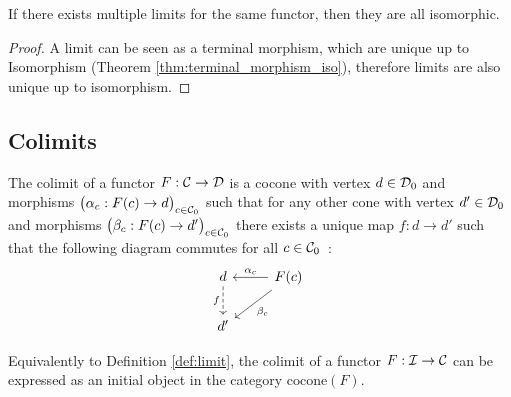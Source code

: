 \begin{theorem}
	If there exists multiple limits for the same functor, then they are all
	isomorphic.

	\begin{proof}
		A limit can be seen as a terminal morphism, which are unique up to
		Isomorphism (Theorem \ref{thm:terminal_morphism_iso}), therefore limits are
		also unique up to isomorphism.
	\end{proof}
\end{theorem}

\subsection{Colimits}

\begin{definition}
	The colimit of a functor $F:\mathcal{C}\to \mathcal{D}$ is a cocone with vertex $d\in \mathcal{D}_0$ and
	morphisms $\big(\alpha_c: F(c)\to d\big)_{c\in \mathcal{C}_0}$ such that for any other
	cone with vertex $d'\in \mathcal{D}_0$ and morphisms $\big(\beta_c: F(c)\to
	d'\big)_{c\in \mathcal{C}_0}$ there exists a unique map $f:d\to d'$ such that the
	following diagram commutes for all $c\in
	\mathcal{C}_0$~\parencite{leinster:basic_category_theory}:
	\[\begin{tikzcd}[ampersand replacement=\&]
		d \& {F(c)} \\
		{d'}
		\arrow["{\alpha_c}"', from=1-2, to=1-1]
		\arrow["{\beta_c}", from=1-2, to=2-1]
		\arrow["f"', dashed, from=1-1, to=2-1]
	\end{tikzcd}\]
\end{definition}

\begin{definition}
	Equivalently to Definition \ref{def:limit}, the colimit of a functor $F:\mathcal{I}\to
	\mathcal{C}$ can be expressed as an initial object in the category
	$\mathrm{cocone}(F)$.
\end{definition}

